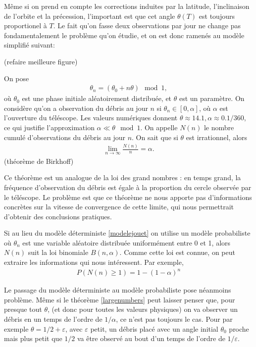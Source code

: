 \documentclass[11pt,a4paper,reqno]{amsart}
\newcommand{\eps}{\varepsilon}
\begin{document}
Même si on prend en compte les corrections induites par la latitude,
l'inclinaison de l'orbite et la précession, l'important est que cet
angle $\theta(T)$ est toujours proportionel à $T$. Le fait qu'on fasse
deux observations par jour ne change pas fondamentalement le problème
qu'on étudie, et on est donc ramenés au modèle simplifié suivant:

\begin{center}
  
  
  (refaire meilleure figure)
\end{center}

On pose
\begin{align}
  \label{modelejouet}
  \theta_{n} = (\theta_{0} + n \theta) \mod 1,
\end{align}
où $\theta_{0}$ est une phase initiale aléatoirement distribuée, et
$\theta$ est un paramètre. On considère qu'on a observation du débris
au jour $n$ si $\theta_{n} \in [0,\alpha]$, où $\alpha$ est
l'ouverture du téléscope. Les valeurs numériques donnent $\theta
\approx 14.1, \alpha \approx 0.1/360$, ce qui justifie l'approximation
$\alpha \ll \theta \mod 1$. On appelle $N(n)$ le nombre cumulé
d'observations du débris au jour $n$. On sait que si $\theta$ est
irrationnel, alors
\begin{align}
  \label{largenumbers}
  \lim_{n\to\infty} \frac{N(n)} n = \alpha.
\end{align}
(théorème de Birkhoff)

Ce théorème est un analogue de la loi des grand nombres : en temps
grand, la fréquence d'observation du débris est égale à la proportion
du cercle observée par le téléscope. Le problème est que ce théorème
ne nous apporte pas d'informations concrètes sur la vitesse de
convergence de cette limite, qui nous permettrait d'obtenir des
conclusions pratiques. 

Si au lieu du modèle déterministe \eqref{modelejouet} on utilise un
modèle probabiliste où $\theta_{n}$ est une variable aléatoire
distribuée uniformément entre 0 et 1, alors $N(n)$ suit la loi
binomiale $B(n,\alpha)$. Comme cette loi est connue, on peut extraire
les informations qui nous intéressent. Par exemple,
\begin{align}
  P(N(n) \geq 1) = 1 - (1-\alpha)^{n}
\end{align}

Le passage du modèle déterministe au modèle probabiliste pose
néanmoins problème. Même si le théorème \eqref{largenumbers} peut
laisser penser que, pour presque tout $\theta$, (et donc pour toutes
les valeurs physiques) on va observer un débris en un temps de l'ordre
de $1/\alpha$, ce n'est pas toujours le cas. Pour par exemple $\theta
= 1/2 + \eps$, avec $\eps$ petit, un débris placé avec un angle
initial $\theta_{0}$ proche mais plus petit que $1/2$ va être observé
au bout d'un temps de l'ordre de $1/\eps$.
\end{document}
